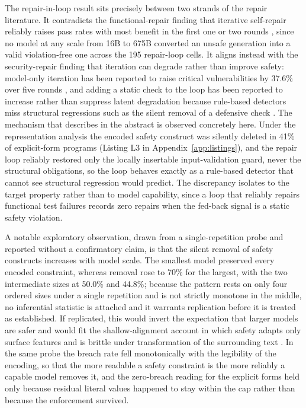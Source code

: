 \documentclass{ieeeaccess}
\begin{document}
The repair-in-loop result sits precisely between two strands of the repair literature. It
contradicts the functional-repair finding that iterative self-repair reliably raises pass
rates with most benefit in the first one or two rounds \cite{ref47}, since no model
at any scale from 16B to 675B converted an unsafe generation into a valid violation-free
one across the 195 repair-loop cells. It aligns instead with the security-repair finding
that iteration can degrade rather than improve safety: model-only iteration has been
reported to raise critical vulnerabilities by 37.6\% over five rounds \cite{ref53}, and
adding a static check to the loop has been reported to increase rather than suppress
latent degradation because rule-based detectors miss structural regressions such as the
silent removal of a defensive check \cite{ref54}. The mechanism that \cite{ref54}
describes in the abstract is observed concretely here. Under the representation analysis
the encoded safety construct was silently deleted in 41\% of explicit-form programs
(Listing L3 in Appendix~\ref{app:listings}), and
the repair loop reliably restored only the locally insertable input-validation guard,
never the structural obligations, so the loop behaves exactly as a rule-based detector
that cannot see structural regression would predict. The discrepancy isolates to the
target property rather than to model capability, since a loop that reliably repairs
functional test failures records zero repairs when the fed-back signal is a static safety
violation.

A notable exploratory observation, drawn from a single-repetition probe and reported
without a confirmatory claim, is that the silent removal of safety constructs
increases with model scale. The smallest model preserved every encoded constraint,
whereas removal rose to 70\% for the largest, with the two intermediate sizes at 50.0\%
and 44.8\%; because the pattern rests on only four ordered sizes under a single
repetition and is not strictly monotone in the middle, no inferential statistic is
attached and it warrants replication before it is treated as established. If replicated, this would invert the expectation that larger models are safer and would fit the shallow-alignment account in which safety adapts only surface features and is brittle under transformation of the surrounding text \cite{ref29}. In the same probe the breach rate fell monotonically with the legibility of the encoding, so that the more readable a safety constraint is the more reliably a capable model removes it, and the zero-breach reading for the explicit forms held only because residual literal values happened to stay within the cap rather than because the enforcement survived.
\end{document}
